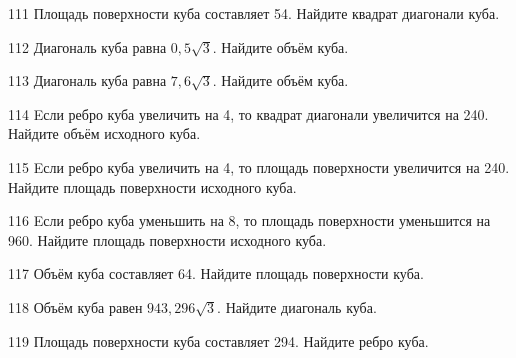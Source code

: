 \begin{taskBN}{111}
Площадь поверхности куба составляет 54. Найдите квадрат диагонали куба.
\end{taskBN}

\begin{taskBN}{112}
Диагональ куба равна $0,5\sqrt{3}$. Найдите объём куба.
\end{taskBN}

\begin{taskBN}{113}
Диагональ куба равна $7,6\sqrt{3}$. Найдите объём куба.
\end{taskBN}

\begin{taskBN}{114}
Eсли ребро куба увеличить на 4, то квадрат диагонали увеличится на 240. Найдите объём исходного куба.
\end{taskBN}

\begin{taskBN}{115}
Eсли ребро куба увеличить на 4, то площадь поверхности увеличится на 240. Найдите площадь поверхности исходного куба.
\end{taskBN}

\begin{taskBN}{116}
Eсли ребро куба уменьшить на 8, то площадь поверхности уменьшится на 960. Найдите площадь поверхности исходного куба.
\end{taskBN}

\begin{taskBN}{117}
Объём куба составляет 64. Найдите площадь поверхности куба.
\end{taskBN}

\begin{taskBN}{118}
Объём куба равен $943,296\sqrt{3}$. Найдите диагональ куба.
\end{taskBN}

\begin{taskBN}{119}
Площадь поверхности куба составляет 294. Найдите ребро куба.
\end{taskBN}

